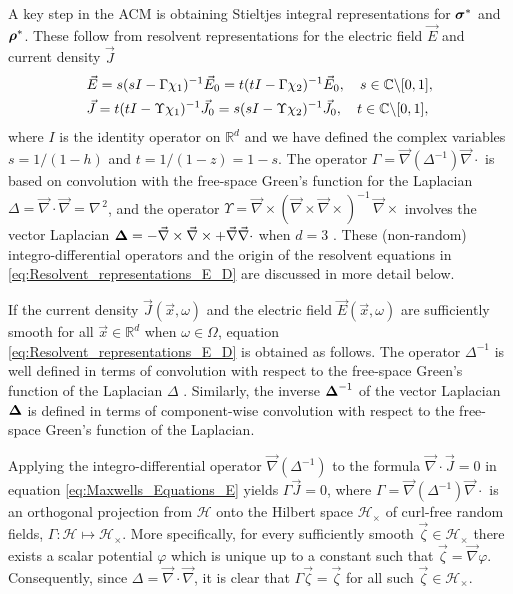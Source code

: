 \documentclass{cmslatex}
\newcommand\bsig{\mbox{\boldmath${\sigma}$}}
\newcommand\brho{\mbox{\boldmath${\rho}$}}
\newcommand\bDelta{\mbox{\boldmath${\Delta}$}}
\begin{document}
A key step in the ACM is
obtaining Stieltjes integral representations for $\bsig^*$ and
$\brho^*$. These follow from resolvent representations for the
electric field $\vec{E}$ \cite{Golden:CMP-473} and current density
$\vec{J}$ \cite{Murphy:JMP:063506}
%
\begin{align}\label{eq:Resolvent_representations_E_D}
  &\vec{E}=s(sI-\Gamma\chi_1)^{-1}\vec{E}_0=t(tI-\Gamma\chi_2)^{-1}\vec{E}_0 ,
  \quad
   s\in\mathbb{C}\backslash[0,1],\\
  &\vec{J}=t(tI-\Upsilon\chi_1)^{-1}\vec{J}_0=s(sI-\Upsilon\chi_2)^{-1}\vec{J}_0 ,
  \quad
   t\in\mathbb{C}\backslash[0,1],\notag 
\end{align}
%
where $I$ is the identity operator on $\mathbb{R}^d$ and we have
defined the complex variables $s=1/(1-h)$ and $t=1/(1-z)=1-s$. 
The operator $\Gamma=\vec{\nabla}(\Delta^{-1})\vec{\nabla}\cdot$ is based on
convolution with the free-space Green's function for the Laplacian
$\Delta=\vec{\nabla}\cdot\vec{\nabla}=\nabla^{\,2}$, and the operator
$\Upsilon=\vec{\nabla}\times(\vec{\nabla}\times\vec{\nabla}\times)^{-1}\,\vec{\nabla}\times$ involves the vector
Laplacian $\bDelta=- \vec{\nabla}\times\vec{\nabla}\times + \vec{\nabla}\vec{\nabla}\cdot $ when $d=3$
\cite{Golden:CMP-473,Murphy:JMP:063506}. These (non-random)
integro-differential operators and the origin of the resolvent
equations in \eqref{eq:Resolvent_representations_E_D} are discussed in
more detail below.       



If the current density $\vec{J}(\vec{x},\omega)$ and the electric
field $\vec{E}(\vec{x},\omega)$ are sufficiently smooth for all
$\vec{x}\in\mathbb{R}^d$ when $\omega\in\Omega$, equation 
\eqref{eq:Resolvent_representations_E_D} is obtained as
follows. The operator $\Delta^{-1}$ is
well defined in terms of convolution with respect to the free-space
Green's function of the Laplacian $\Delta$
\cite{Golden:CMP-473,Folland:95}. Similarly, the inverse
$\bDelta^{-1}$ of the vector Laplacian $\bDelta$ is defined in terms
of component-wise convolution with respect to the free-space Green's
function of the Laplacian.


Applying the integro-differential
operator $\vec{\nabla}(\Delta^{-1})$ to the
formula $\vec{\nabla}\cdot\vec{J}=0$ in equation
\eqref{eq:Maxwells_Equations_E} yields $\Gamma\vec{J}=0$, where
$\Gamma=\vec{\nabla}(\Delta^{-1})\vec{\nabla}\cdot$ is an orthogonal projection
\cite{Golden:CMP-473} from $\mathscr{H}$ onto the Hilbert space
$\mathscr{H}_\times$ of curl-free random fields,
$\Gamma:\mathscr{H}\mapsto\mathscr{H}_\times$. More specifically, for every
sufficiently smooth $\vec{\zeta}\in\mathscr{H}_\times$ there exists
\cite{Jackson-1999} a scalar potential $\varphi$ which is unique up to a 
constant such that $\vec{\zeta}=\vec{\nabla}\varphi$. Consequently, since
$\Delta=\vec{\nabla}\cdot\vec{\nabla}$, it is clear that $\Gamma\vec{\zeta}=\vec{\zeta}$ for all such
$\vec{\zeta}\in\mathscr{H}_\times$.  
\end{document}
